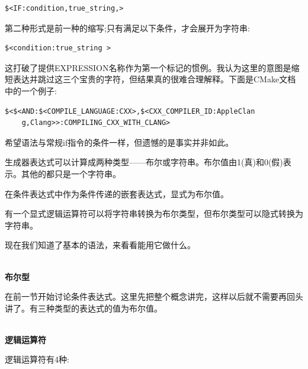 \begin{lstlisting}[style=styleCMake]
$<IF:condition,true_string,>
\end{lstlisting}

第二种形式是前一种的缩写;只有满足以下条件，才会展开为字符串:

\begin{lstlisting}[style=styleCMake]
$<condition:true_string >
\end{lstlisting}

这打破了提供EXPRESSION名称作为第一个标记的惯例。我认为这里的意图是缩短表达并跳过这三个宝贵的字符，但结果真的很难合理解释。下面是CMake文档中的一个例子:

\begin{lstlisting}[style=styleCMake]
$<$<AND:$<COMPILE_LANGUAGE:CXX>,$<CXX_COMPILER_ID:AppleClan
	g,Clang>>:COMPILING_CXX_WITH_CLANG>
\end{lstlisting}

希望语法与常规if指令的条件一样，但遗憾的是事实并非如此。


生成器表达式可以计算成两种类型——布尔或字符串。布尔值由1(真)和0(假)表示。其他的都只是一个字符串。

在条件表达式中作为条件传递的嵌套表达式，显式为布尔值。

有一个显式逻辑运算符可以将字符串转换为布尔类型，但布尔类型可以隐式转换为字符串。

现在我们知道了基本的语法，来看看能用它做什么。

\hspace*{\fill} \\ %
\noindent
\textbf{布尔型}

在前一节开始讨论条件表达式。这里先把整个概念讲完，这样以后就不需要再回头讲了。有三种类型的表达式的值为布尔值。

\hspace*{\fill} \\ %
\noindent
\textbf{逻辑运算符}

逻辑运算符有4种:

